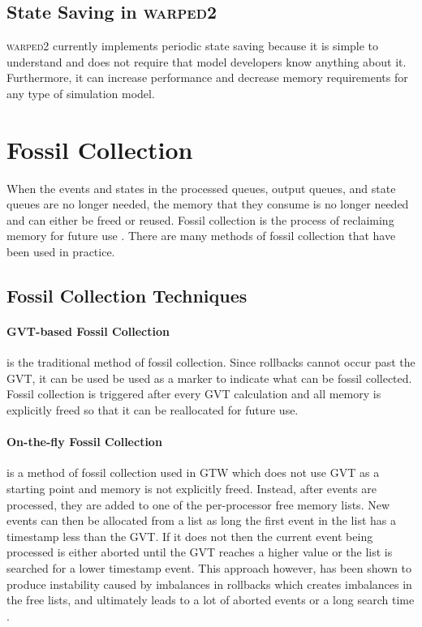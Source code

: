 \documentclass[11pt]{book}
\begin{document}
\subsection{State Saving in \textsc{warped2}}

\textsc{warped2} currently implements periodic state saving because it is simple to understand and
does not require that model developers know anything about it.  Furthermore, it can increase
performance and decrease memory requirements for any type of simulation model.

\section{Fossil Collection}

When the events and states in the processed queues, output queues, and state queues are no longer
needed, the memory that they consume is no longer needed and can either be freed or reused.  Fossil
collection is the process of reclaiming memory for future use \cite{fujimoto-90,fujimoto-00}.  There
are many methods of fossil collection that have been used in practice.

\subsection{Fossil Collection Techniques}

\paragraph{GVT-based Fossil Collection} is the traditional method of fossil collection.  Since
rollbacks cannot occur past the GVT, it can be used be used as a marker to indicate what can be
fossil collected.  Fossil collection is triggered after every GVT calculation and all memory is
explicitly freed so that it can be reallocated for future use.

\paragraph{On-the-fly Fossil Collection} is a method of fossil collection used in GTW which does not
use GVT as a starting point and memory is not explicitly freed.  Instead, after events are
processed, they are added to one of the per-processor free memory lists.  New events can then be
allocated from a list as long the first event in the list has a timestamp less than the GVT.  If it
does not then the current event being processed is either aborted until the GVT reaches a higher
value or the list is searched for a lower timestamp event.  This approach however, has been shown to
produce instability caused by imbalances in rollbacks which creates imbalances in the free lists,
and ultimately leads to a lot of aborted events or a long search time \cite{carothers-00}.
\end{document}
